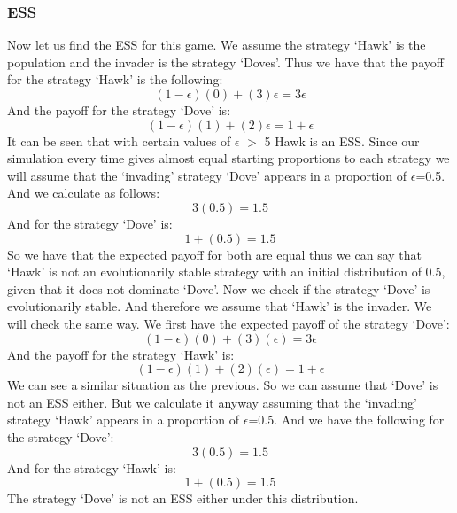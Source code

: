 \documentclass{book}
\begin{document}
\subsubsection{ESS}
Now let us find the ESS for this game. We assume the strategy  `Hawk' is the population and the invader is the strategy `Doves'. Thus we have that the payoff for the strategy `Hawk' is the following:
\begin{equation}
(1-{\epsilon})(0) + (3){\epsilon} = 3{\epsilon}
\end{equation}
And the payoff for the strategy `Dove' is:
\begin{equation}
(1-{\epsilon})(1) + (2){\epsilon} = 1 + {\epsilon}
\end{equation}
It can be seen that with certain values of $\epsilon$ $>$ 5 Hawk is an ESS. Since our simulation every time gives almost equal starting proportions to each strategy we will assume that the `invading' strategy `Dove' appears in a proportion of $\epsilon$=0.5. And we calculate as follows:
\begin{equation}
3(0.5) = 1.5
\end{equation}
And for the strategy `Dove' is:
\begin{equation}
 1 + (0.5) = 1.5
\end{equation}
So we have that the expected payoff for both are equal thus we can say that `Hawk' is not an evolutionarily stable strategy with an initial distribution of 0.5, given that it does not dominate `Dove'.
Now we check if the strategy `Dove' is evolutionarily stable. And therefore we assume that `Hawk' is the invader. We will check the same way. We first have the expected payoff of the strategy `Dove':
\begin{equation}
(1-{\epsilon})(0) + (3)({\epsilon}) = 3{\epsilon} 
\end{equation}
And the payoff for the strategy `Hawk' is:
\begin{equation}
(1-{\epsilon})(1) + (2)({\epsilon}) =  1 + {\epsilon}
\end{equation}
We can see a similar situation as the previous. So we can assume that `Dove' is not an ESS either. But we calculate it anyway assuming that the `invading' strategy `Hawk' appears in a proportion of $\epsilon$=0.5. And we have the following for the strategy `Dove':
\begin{equation}
3(0.5) = 1.5
\end{equation}
And for the strategy `Hawk' is:
\begin{equation}
 1 + (0.5) = 1.5
\end{equation}
The strategy `Dove' is not an ESS either under this distribution.
\end{document}
